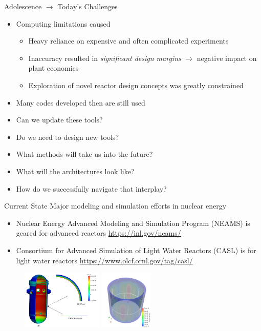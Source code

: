 \documentclass[xcolor=x11names,compress]{beamer}
\renewcommand{\(}{\begin{columns}}
\renewcommand{\)}{\end{columns}}
\newcommand{\<}[1]{\begin{column}{#1}}
\renewcommand{\>}{\end{column}}
\begin{document}
\begin{frame}{Adolescence $\rightarrow$ Today's Challenges}
\begin{itemize}
\item Computing limitations caused
\begin{itemize}
\item Heavy reliance on expensive and often complicated experiments
\item Inaccuracy resulted in \emph{significant design margins} $\rightarrow$ negative impact on plant economics
\item Exploration of novel reactor design concepts was greatly constrained 
\vspace*{1 em}
\end{itemize}
\item Many codes developed then are still used 
\pause
\item Can we update these tools?
\pause
\item Do we need to design new tools?
\pause
\item What methods will take us into the future?
\pause
\item What will the architectures look like?
\pause
\item How do we successfully navigate that interplay?
\end{itemize}
\end{frame}

\begin{frame}{Current State}
Major modeling and simulation efforts in nuclear energy
\begin{itemize}
\item Nuclear Energy Advanced Modeling and Simulation Program (NEAMS) is geared for advanced reactors \url{https://inl.gov/neams/}
\item Consortium for Advanced Simulation of Light Water Reactors (CASL) is for light water reactors \url{https://www.olcf.ornl.gov/tag/casl/}
\end{itemize}
\begin{figure}
\includegraphics[height=1.1in,clip]{../figs/GrizzlyNEAMS}
\hspace*{3 em}
\includegraphics[height=1.1in,clip]{../figs/Grizzly2NEAMS}
\end{figure}

\end{frame}
\end{document}

